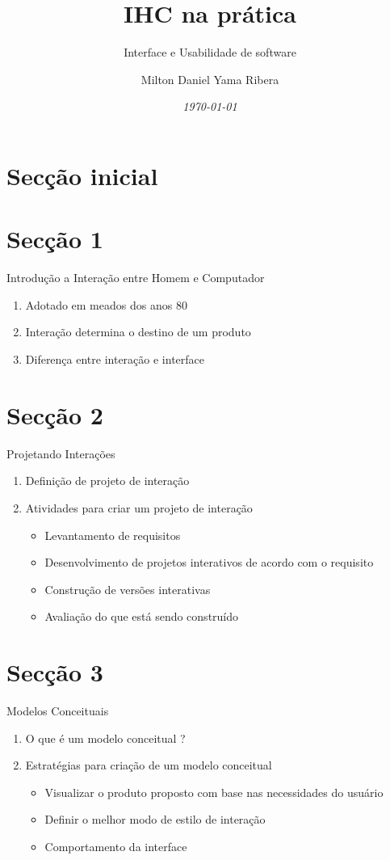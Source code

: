 \documentclass{beamer}
\title{\textbf{IHC na prática}}
\subtitle{Interface e Usabilidade de software}
\author{Milton Daniel Yama Ribera}
\institute{União das Escolas Superiores de Rondônia - UNIRON}
\date{\tiny{\textit{\today}}}
\begin{document}
	\section{Secção inicial}
	\begin{frame}
		\titlepage
	\end{frame}

	\section{Secção 1}
	\begin{frame} {Introdução a Interação entre Homem e Computador}
		\begin{enumerate}
			\item Adotado em meados dos anos 80
			\item Interação determina o destino de um produto
			\item Diferença entre interação e interface
		\end{enumerate}
	\end{frame}

	\section{Secção 2}
	\begin{frame} {Projetando Interações}
		\begin{enumerate}
			\item Definição de projeto de interação
			\item Atividades para criar um projeto de interação
				\begin{itemize}
					\item Levantamento de requisitos
					\item Desenvolvimento de projetos interativos de acordo com o requisito
					\item Construção de versões interativas
					\item Avaliação do que está sendo construído
				\end{itemize}
		\end{enumerate}
	\end{frame}

	\section{Secção 3}
	\begin{frame} {Modelos Conceituais}
		\begin{enumerate}
			\item O que é um modelo conceitual ?
			\item Estratégias para criação de um modelo conceitual
				\begin{itemize}
					\item Visualizar o produto proposto com base nas necessidades do usuário
					\item Definir o melhor modo de estilo de interação
					\item Comportamento da interface
				\end{itemize}
		\end{enumerate}
	\end{frame}
	
\end{document}
